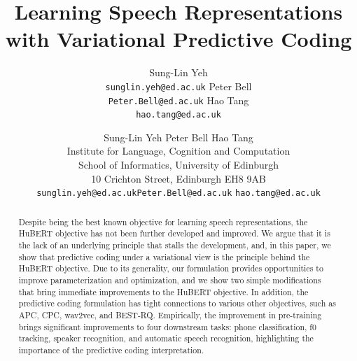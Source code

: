 \documentclass[11pt,a4paper]{article}
\title{Learning Speech Representations with Variational Predictive Coding}
\author{
  Sung-Lin Yeh
  \\
  \texttt{\small sunglin.yeh@ed.ac.uk}
  \And
  Peter Bell
  \\
  \texttt{\small Peter.Bell@ed.ac.uk}
  \And
  Hao Tang
  \\
  \texttt{\small hao.tang@ed.ac.uk}
}
\author{{Sung-Lin Yeh \qquad Peter Bell \qquad Hao Tang} \\              
Institute for Language, Cognition and Computation \\
School of Informatics, University of Edinburgh \\
10 Crichton Street, Edinburgh EH8 9AB\\
\texttt{\small sunglin.yeh@ed.ac.uk}\quad \texttt{\small Peter.Bell@ed.ac.uk} \quad \texttt{\small hao.tang@ed.ac.uk}}
\date{}
\begin{document}
\maketitle
\begin{abstract}
%
%
%
%
%
%
%

Despite being the best known objective for learning speech representations, the HuBERT objective has not been further developed and improved.
We argue that it is the lack of an underlying principle that stalls the development,
and, in this paper, we show that predictive coding under a variational view is the principle behind the HuBERT objective.
Due to its generality, our formulation provides opportunities to improve parameterization and optimization, and we show two simple modifications that bring immediate improvements to the HuBERT objective.
In addition, the predictive coding formulation has tight connections to various other objectives, such as APC, CPC, wav2vec, and BEST-RQ.
Empirically, the improvement in pre-training brings significant improvements to four downstream tasks: phone classification, f0 tracking, speaker recognition, and automatic speech recognition, highlighting the importance of the predictive coding interpretation.
\end{abstract}
\end{document}
